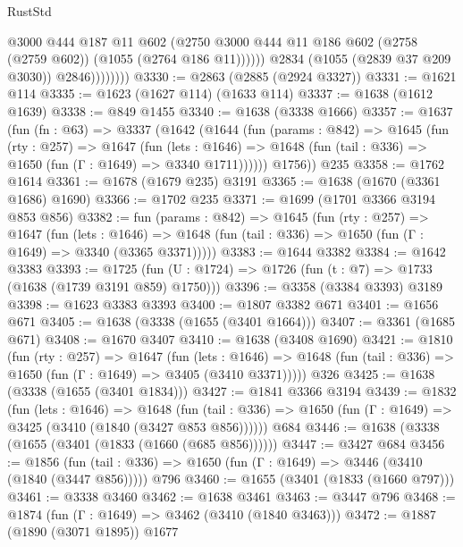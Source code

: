 \begin{lexlean}{RustStd}
\begin{coremodule}
                          @3000
                          @444
                          @187
                          @11
                          @602
                          (@2750
                            @3000
                            @444
                            @11
                            @186
                            @602
                            (@2758 (@2759 @602))
                            (@1055 (@2764 @186 @11))))))
                    @2834
                    (@1055 (@2839 @37 @209 @3030))
                    @2846))))))))
@3330 := @2863 (@2885 (@2924 @3327))
@3331 := @1621 @114
@3335 := @1623 (@1627 @114) (@1633 @114)
@3337 := @1638 (@1612 @1639)
@3338 := @849 @1455
@3340 := @1638 (@3338 @1666)
@3357 := @1637
    (fun (fn : @63) =>
    @3337
      (@1642
        (@1644
          (fun (params : @842) =>
          @1645
            (fun (rty : @257) =>
            @1647
              (fun (lets : @1646) =>
              @1648 (fun (tail : @336) => @1650 (fun (Γ : @1649) => @3340 @1711))))))
        @1756))
    @235
@3358 := @1762 @1614
@3361 := @1678 (@1679 @235) @3191
@3365 := @1638 (@1670 (@3361 @1686) @1690)
@3366 := @1702 @235
@3371 := @1699 (@1701 @3366 @3194 @853 @856)
@3382 := fun (params : @842) =>
  @1645
    (fun (rty : @257) =>
    @1647
      (fun (lets : @1646) =>
      @1648 (fun (tail : @336) => @1650 (fun (Γ : @1649) => @3340 (@3365 @3371)))))
@3383 := @1644 @3382
@3384 := @1642 @3383
@3393 := @1725 (fun (U : @1724) => @1726 (fun (t : @7) => @1733 (@1638 (@1739 @3191 @859) @1750)))
@3396 := @3358 (@3384 @3393) @3189
@3398 := @1623 @3383 @3393
@3400 := @1807 @3382 @671
@3401 := @1656 @671
@3405 := @1638 (@3338 (@1655 (@3401 @1664)))
@3407 := @3361 (@1685 @671)
@3408 := @1670 @3407
@3410 := @1638 (@3408 @1690)
@3421 := @1810
    (fun (rty : @257) =>
    @1647
      (fun (lets : @1646) =>
      @1648 (fun (tail : @336) => @1650 (fun (Γ : @1649) => @3405 (@3410 @3371)))))
    @326
@3425 := @1638 (@3338 (@1655 (@3401 @1834)))
@3427 := @1841 @3366 @3194
@3439 := @1832
    (fun (lets : @1646) =>
    @1648 (fun (tail : @336) => @1650 (fun (Γ : @1649) => @3425 (@3410 (@1840 (@3427 @853 @856))))))
    @684
@3446 := @1638 (@3338 (@1655 (@3401 (@1833 (@1660 (@685 @856))))))
@3447 := @3427 @684
@3456 := @1856
    (fun (tail : @336) => @1650 (fun (Γ : @1649) => @3446 (@3410 (@1840 (@3447 @856)))))
    @796
@3460 := @1655 (@3401 (@1833 (@1660 @797)))
@3461 := @3338 @3460
@3462 := @1638 @3461
@3463 := @3447 @796
@3468 := @1874 (fun (Γ : @1649) => @3462 (@3410 (@1840 @3463)))
@3472 := @1887 (@1890 (@3071 @1895)) @1677

\end{coremodule}
\end{lexlean}
